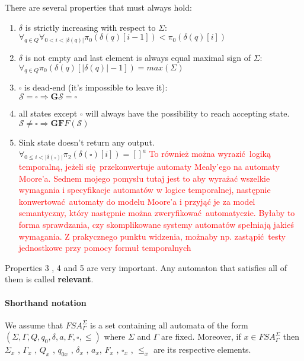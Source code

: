 \documentclass[12pt]{article}
\begin{document}
There are several properties that must always hold:
\begin{enumerate}
	\item $\delta$ is strictly increasing with respect to $\Sigma$: \\ 
	$\forall_{q\in Q} \forall_{0<i<\vert\delta(q)\vert}  \pi_0(\delta(q)[i-1]) <  \pi_0(\delta(q)[i])$
	\item $\delta$ is not empty and last element is always equal maximal sign of $\Sigma$: \\ 
	$\forall_{q\in Q}  \pi_0(\delta(q)[\vert \delta(q) \vert - 1]) = max(\Sigma)$
	\item $\square$ is dead-end (it's impossible to leave it): \\
	$\mathcal{S} = \square \Rightarrow\mathbf{ G} \mathcal{S} = \square$
	\item all states except $\square$ will always have the possibility to reach accepting state. \\
	$\mathcal{S} \ne \square \Rightarrow \mathbf{G}\mathbf{F} F(\mathcal{S})$
	\item Sink state doesn't return any output. \\
	$\forall_{0\le i<\vert \delta(\square) \vert} \pi_2( \delta(\square)[i] ) =  []^a$
	\textcolor{red}{To również można wyrazić logiką temporalną, jeżeli się przekonwertuje automaty Mealy'ego na automaty Moore'a. Sednem mojego pomysłu tutaj jest to aby wyrażać wszelkie wymagania i specyfikacje automatów w logice temporalnej, następnie konwertować automaty do modelu Moore'a i przyjąć je za model semantyczny, który następnie można zweryfikować automatyczie. Byłaby to forma sprawdzania, czy skomplikowane systemy automatów spełniają jakieś wymagania. Z prakycznego punktu widzenia, możnaby np. zastąpić testy jednostkowe przy pomocy formuł temporalnych}
\end{enumerate}
 Properties 3 , 4 and 5 are very important. Any automaton that satisfies all of them is called \textbf{relevant}. \\
 
\paragraph{Shorthand notation} We assume that $FSA^{\Sigma}_{\Gamma}$ is a set containing all automata of the form $(\Sigma ,\Gamma ,  Q , q_0 , \delta , a , F , \square , \le )$ where $\Sigma$ and $\Gamma$ are fixed. Moreover, if $x \in FSA^{\Sigma}_{\Gamma}$ then  $\Sigma_x $ , $\Gamma_x $ , $Q_x $  , $q_{0x} $  , $\delta_x $ , $a_x$, $F_x $  , $\square_x  $ , $\le_x $  are its respective elements. \\
 
\end{document}
